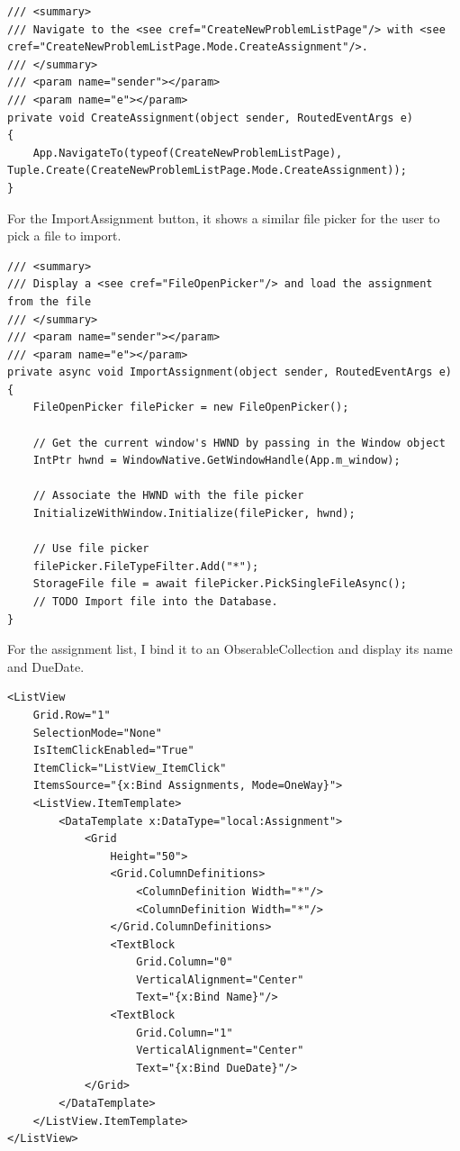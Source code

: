 \documentclass[a4paper]{report}
\begin{document}
\begin{verbatim}
/// <summary>
/// Navigate to the <see cref="CreateNewProblemListPage"/> with <see cref="CreateNewProblemListPage.Mode.CreateAssignment"/>.
/// </summary>
/// <param name="sender"></param>
/// <param name="e"></param>
private void CreateAssignment(object sender, RoutedEventArgs e)
{
    App.NavigateTo(typeof(CreateNewProblemListPage), Tuple.Create(CreateNewProblemListPage.Mode.CreateAssignment));
}
\end{verbatim}

For the ImportAssignment button, it shows a similar file picker for the user to pick a file to import.

\begin{verbatim}
/// <summary>
/// Display a <see cref="FileOpenPicker"/> and load the assignment from the file
/// </summary>
/// <param name="sender"></param>
/// <param name="e"></param>
private async void ImportAssignment(object sender, RoutedEventArgs e)
{
    FileOpenPicker filePicker = new FileOpenPicker();

    // Get the current window's HWND by passing in the Window object
    IntPtr hwnd = WindowNative.GetWindowHandle(App.m_window);

    // Associate the HWND with the file picker
    InitializeWithWindow.Initialize(filePicker, hwnd);

    // Use file picker
    filePicker.FileTypeFilter.Add("*");
    StorageFile file = await filePicker.PickSingleFileAsync();
    // TODO Import file into the Database.
}
\end{verbatim}

For the assignment list, I bind it to an ObserableCollection and display its name and DueDate.

\begin{verbatim}
<ListView
    Grid.Row="1"
    SelectionMode="None"
    IsItemClickEnabled="True"
    ItemClick="ListView_ItemClick"
    ItemsSource="{x:Bind Assignments, Mode=OneWay}">
    <ListView.ItemTemplate>
        <DataTemplate x:DataType="local:Assignment">
            <Grid
                Height="50">
                <Grid.ColumnDefinitions>
                    <ColumnDefinition Width="*"/>
                    <ColumnDefinition Width="*"/>
                </Grid.ColumnDefinitions>
                <TextBlock 
                    Grid.Column="0"
                    VerticalAlignment="Center"
                    Text="{x:Bind Name}"/>
                <TextBlock
                    Grid.Column="1"
                    VerticalAlignment="Center"
                    Text="{x:Bind DueDate}"/>
            </Grid>
        </DataTemplate>
    </ListView.ItemTemplate>
</ListView>
\end{verbatim}
\end{document}
